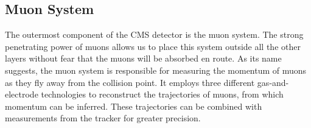 
\subsection{Muon System}
\label{ssec:cms:components:muon}

The outermost component of the CMS detector is the muon system. The
strong penetrating power of muons allows us to place this system
outside all the other layers without fear that the muons will be
absorbed en route. As its name suggests, the muon system is
responsible for measuring the momentum of muons as they fly away from
the collision point. It employs three different gas-and-electrode
technologies to reconstruct the trajectories of muons, from which
momentum can be inferred. These trajectories can be combined with
measurements from the tracker for greater precision.


